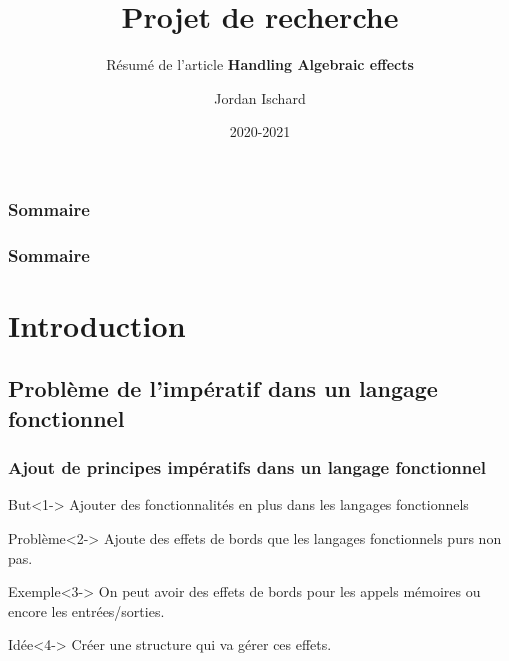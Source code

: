 \documentclass{beamer}
\title{Projet de recherche}
\subtitle{Résumé de l'article \textbf{Handling Algebraic effects}}
\author{Jordan Ischard}
\institute{Université d'Orléans}
\date{2020-2021}
\begin{document}
\AtBeginSection
{
  \begin{frame}
    \frametitle{Sommaire}
    \tableofcontents[currentsection,subsectionstyle=show/shaded/hide]
  \end{frame}
}

\AtBeginSubsection
{
  \begin{frame} 
	\frametitle{Sommaire}
	\tableofcontents[subsectionstyle=show/shaded/hide]
  \end{frame}
}



\frame{\titlepage}

\section{Introduction}

\subsection{Problème de l'impératif dans un langage fonctionnel}
\begin{frame}
\frametitle{Ajout de principes impératifs dans un langage fonctionnel}

	\begin{block}{But}<1->
		Ajouter des fonctionnalités en plus dans les langages fonctionnels
	\end{block}

	\begin{alertblock}{Problème}<2->
		Ajoute des effets de bords que les langages fonctionnels purs non pas.
	\end{alertblock}

	\begin{exampleblock}{Exemple}<3->
		On peut avoir des effets de bords pour les appels mémoires ou encore
		les entrées/sorties.
	\end{exampleblock}

	\begin{block}{Idée}<4->
		Créer une structure qui va gérer ces effets.
	\end{block}
\end{frame}
\end{document}
